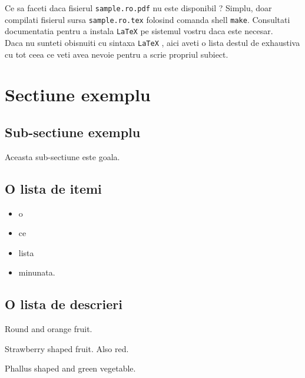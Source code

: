 \documentclass{42-en}
\begin{document}
    Ce sa faceti daca fisierul \texttt{sample.ro.pdf} nu este disponibil ?
    Simplu, doar compilati fisierul sursa \texttt{sample.ro.tex} folosind
    comanda shell \texttt{make}. Consultati documentatia pentru a instala
    \texttt{LaTeX} pe sistemul vostru daca este necesar.\\

    Daca nu sunteti obisnuiti cu sintaxa \texttt{LaTeX} , aici aveti o 
    lista destul de exhaustiva cu tot ceea ce veti avea nevoie pentru a 
    scrie propriul subiect.\\


    \section{Sectiune exemplu}


        \subsection{Sub-sectiune exemplu}

           Aceasta sub-sectiune este goala.


        \newpage


        \subsection{O lista de itemi}

            \begin{itemize}\itemsep1pt
                \item o
                \item ce
                \item lista
                \item minunata.\\
            \end{itemize}


        \subsection{O lista de descrieri}

            \begin{description}\itemsep3pt
                \item [Orange:] Round and orange fruit.
                \item [Strawberry:] Strawberry shaped fruit. Also red.
                \item [Cucumber:] Phallus shaped and green vegetable.\\
            \end{description}
\end{document}
